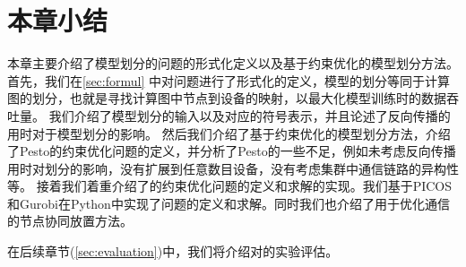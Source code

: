 \section{本章小结}
本章主要介绍了模型划分的问题的形式化定义以及基于约束优化的模型划分方法。
首先，我们在\ref{sec:formul} 中对问题进行了形式化的定义，模型的划分等同于计算图的划分，也就是寻找计算图中节点到设备的映射，以最大化模型训练时的数据吞吐量。
我们介绍了模型划分的输入以及对应的符号表示，并且论述了反向传播的用时对于模型划分的影响。
然后我们介绍了基于约束优化的模型划分方法，介绍了Pesto的约束优化问题的定义，并分析了Pesto的一些不足，例如未考虑反向传播用时对划分的影响，没有扩展到任意数目设备，没有考虑集群中通信链路的异构性等。
接着我们着重介绍了\sys{}的约束优化问题的定义和求解的实现。我们基于PICOS和Gurobi在Python中实现了问题的定义和求解。同时我们也介绍了用于优化通信的节点协同放置方法。

在后续章节(\ref{sec:evaluation})中，我们将介绍对\sys{}的实验评估。
